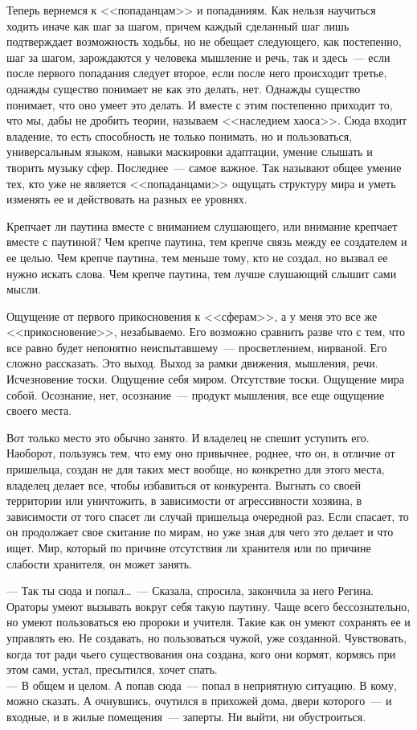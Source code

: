 Теперь вернемся к <<попаданцам>> и попаданиям. Как нельзя научиться ходить 
иначе 
как шаг за шагом, причем каждый сделанный шаг лишь подтверждает возможность 
ходьбы, но не обещает следующего, как постепенно, шаг за шагом, зарождаются у 
человека мышление и речь, так и здесь~--- если после первого попадания следует 
второе, если после него происходит третье, однажды существо понимает не как это 
делать, нет. Однажды существо понимает, что оно умеет это делать. И вместе с 
этим постепенно приходит то, что мы, дабы не дробить теории, называем 
<<наследием 
хаоса>>. Сюда входит владение, то есть способность не только понимать, но и 
пользоваться, универсальным языком, навыки маскировки адаптации, умение слышать 
и творить музыку сфер. Последнее~--- самое важное. Так называют общее умение 
тех, кто уже не является <<попаданцами>> ощущать структуру мира и уметь 
изменять ее и действовать на разных ее уровнях.

Крепчает ли паутина вместе с вниманием слушающего, или внимание крепчает вместе 
с паутиной? Чем крепче паутина, тем крепче связь между ее создателем и ее 
целью. 
Чем крепче паутина, тем меньше тому, кто не создал, но вызвал ее нужно искать 
слова. Чем крепче паутина, тем лучше слушающий слышит сами мысли.

Ощущение от первого прикосновения к <<сферам>>, а у меня это все же 
<<прикосновение>>, незабываемо. Его возможно сравнить разве что с тем, что все 
равно будет непонятно неиспытавшему~--- просветлением, нирваной. Его сложно 
рассказать. Это выход. Выход за рамки движения, мышления, речи. Исчезновение 
тоски. Ощущение себя миром. Отсутствие тоски. Ощущение мира собой. Осознание, 
нет, осознание~--- продукт мышления, все еще ощущение своего места.


Вот только место это обычно занято. И владелец не спешит уступить его. 
Наоборот, 
пользуясь тем, что ему оно привычнее, роднее, что он, в отличие от пришельца, 
создан не для таких мест вообще, но конкретно для этого места, владелец делает 
все, чтобы избавиться от конкурента. Выгнать со своей территории или 
уничтожить, 
в зависимости от агрессивности хозяина, в зависимости от того спасет ли случай 
пришельца очередной раз. Если спасает, то он продолжает свое скитание по мирам, 
но уже зная для чего это делает и что ищет. Мир, который по причине отсутствия 
ли хранителя или по причине слабости хранителя, он может занять.

\noindent --- Так ты сюда и попал\ldots~--- Сказала, спросила, закончила за 
него Регина. Ораторы 
умеют вызывать вокруг себя такую паутину. Чаще всего бессознательно, но умеют 
пользоваться ею пророки и учителя. Такие как он умеют сохранять ее и управлять 
ею. Не создавать, но пользоваться чужой, уже созданной. Чувствовать, когда тот 
ради чьего существования она создана, кого они кормят, кормясь при этом сами, 
устал, пресытился, хочет спать.\\
--- В общем и целом. А попав сюда~--- попал в неприятную ситуацию. В кому, 
можно 
сказать. А очнувшись, очутился в прихожей дома, двери которого~--- и входные, и 
в 
жилые помещения~--- заперты. Ни выйти, ни обустроиться.

